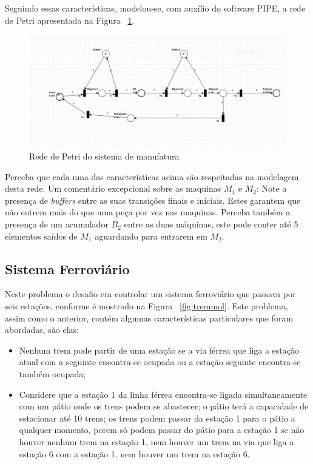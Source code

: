 \documentclass[a4paper,12pt]{article}
\begin{document}
Seguindo essas características, modelou-se, com auxílio do software PIPE, a rede de Petri apresentada na Figura ~\ref{fig:manu}.

\begin{figure}[H]
	\begin{center}
		\includegraphics[width=1.05\linewidth]{manu.JPG}
	\end{center}
	\caption{Rede de Petri do sistema de manufatura}
	\label{fig:manu}
\end{figure}

Perceba que cada uma das características acima são respeitadas na modelagem desta rede. Um comentário excepcional sobre as maquinas $M_1$ e $M_2$: Note a presença de \textit{buffers} entre as suas transições finais e iniciais. Estes garantem que não entrem mais do que uma peça por vez nas maquinas. Perceba também a presença de um acumulador $B_2$ entre as duas máquinas, este pode conter até 5 elementos saídos de $M_1$ aguardando para entrarem em $M_2$.

\subsection{Sistema Ferroviário}
Neste problema o desafio era controlar um sistema ferroviário que passava por seis estações, conforme é mostrado na Figura ~\ref{fig:tremmol}. Este problema, assim como o anterior, contém algumas características particulares que foram abordadas, são elas:
\begin{itemize}
	\item  Nenhum trem pode partir de uma estação se a via férrea que liga a estação atual com a seguinte encontra-se ocupada ou a estação seguinte encontra-se também ocupada;
	\item Considere que a estação 1 da linha férrea encontra-se ligada simultaneamente com um pátio onde os trens podem se abastecer; o pátio terá a capacidade de estacionar até 10 trens; os trens podem passar da estação 1 para o pátio a qualquer momento, porem só podem passar do pátio para a estação 1 se não houver nenhum trem na estação 1, nem houver um trem na via que liga a estação 6 com a estação 1, nem houver um trem na estação 6.
\end{itemize}
\end{document}
